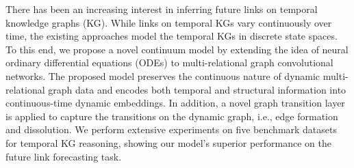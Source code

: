 There has been an increasing interest in inferring future links on temporal knowledge graphs (KG). While links on temporal KGs vary continuously over time, the existing approaches model the temporal KGs in discrete state spaces. To this end, we propose a novel continuum model by extending the idea of neural ordinary differential equations (ODEs) to multi-relational graph convolutional networks. The proposed model preserves the continuous nature of dynamic multi-relational graph data and encodes both temporal and structural information into continuous-time dynamic embeddings. In addition, a novel graph transition layer is applied to capture the transitions on the dynamic graph, i.e., edge formation and dissolution. We perform extensive experiments on five benchmark datasets for temporal KG reasoning, showing our model's superior performance on the future link forecasting task.
